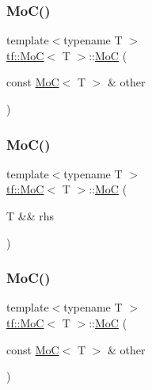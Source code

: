 \mbox{\label{structtf_1_1MoC_a779c86ab4750cd65cdb467065daa70f3}} 
\subsubsection{\texorpdfstring{Mo\+C()}{MoC()}\hspace{0.1cm}{\footnotesize\ttfamily [2/4]}}
{\footnotesize\ttfamily template$<$typename T $>$ \\
\hyperlink{structtf_1_1MoC}{tf\+::\+MoC}$<$ T $>$\+::\hyperlink{structtf_1_1MoC}{MoC} (\begin{DoxyParamCaption}\item[{const \hyperlink{structtf_1_1MoC}{MoC}$<$ T $>$ \&}]{other }\end{DoxyParamCaption})\hspace{0.3cm}{\ttfamily [inline]}}

\mbox{\label{structtf_1_1MoC_a38c6a89465e651e5e0e9001a9abc42b5}} 
\subsubsection{\texorpdfstring{Mo\+C()}{MoC()}\hspace{0.1cm}{\footnotesize\ttfamily [3/4]}}
{\footnotesize\ttfamily template$<$typename T $>$ \\
\hyperlink{structtf_1_1MoC}{tf\+::\+MoC}$<$ T $>$\+::\hyperlink{structtf_1_1MoC}{MoC} (\begin{DoxyParamCaption}\item[{T \&\&}]{rhs }\end{DoxyParamCaption})\hspace{0.3cm}{\ttfamily [inline]}}

\mbox{\label{structtf_1_1MoC_a779c86ab4750cd65cdb467065daa70f3}} 
\subsubsection{\texorpdfstring{Mo\+C()}{MoC()}\hspace{0.1cm}{\footnotesize\ttfamily [4/4]}}
{\footnotesize\ttfamily template$<$typename T $>$ \\
\hyperlink{structtf_1_1MoC}{tf\+::\+MoC}$<$ T $>$\+::\hyperlink{structtf_1_1MoC}{MoC} (\begin{DoxyParamCaption}\item[{const \hyperlink{structtf_1_1MoC}{MoC}$<$ T $>$ \&}]{other }\end{DoxyParamCaption})\hspace{0.3cm}{\ttfamily [inline]}}



